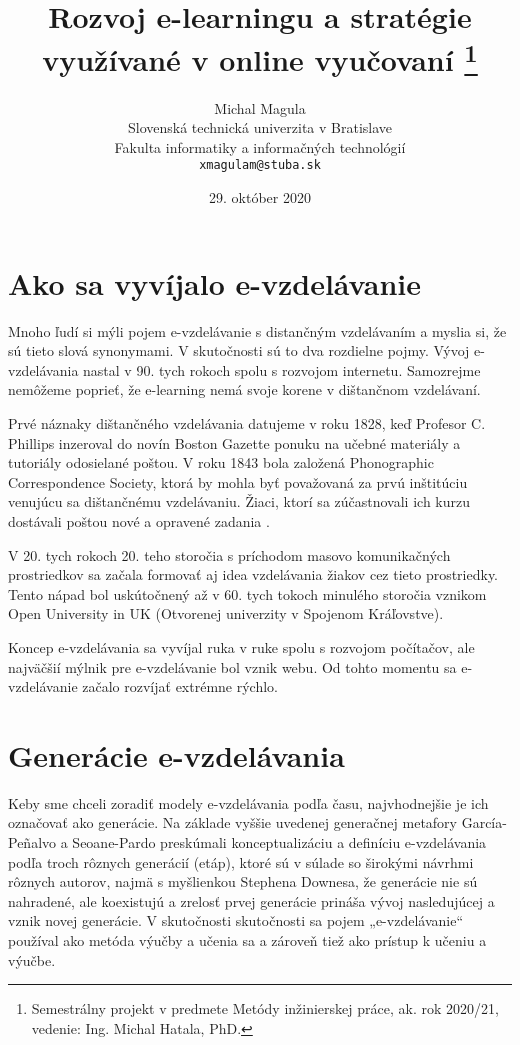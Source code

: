 \documentclass[10pt,slovak,a4paper]{article}
\title
{
	Rozvoj e-learningu a stratégie využívané v online vyučovaní
	\thanks
	{
		Semestrálny projekt v predmete Metódy inžinierskej práce, ak. rok 2020/21, vedenie: Ing. Michal Hatala, PhD.
	}
} %
\author{Michal Magula\\[2pt]
	{\small Slovenská technická univerzita v Bratislave}\\
	{\small Fakulta informatiky a informačných technológií}\\
	{\small \texttt{xmagulam@stuba.sk}}
	}
\date{\small 29. október 2020}
\begin{document}
\maketitle

\begin{abstract}
	
\end{abstract}

\section{Ako sa vyvíjalo e-vzdelávanie} \label{Evolution}

	Mnoho ľudí si mýli pojem e-vzdelávanie s distančným vzdelávaním a myslia si, že sú tieto slová synonymami.
	V skutočnosti sú to dva rozdielne pojmy. Vývoj e-vzdelávania nastal v 90. tych rokoch spolu s rozvojom internetu.
	Samozrejme nemôžeme poprieť, že e-learning nemá svoje korene v dištančnom vzdelávaní.\cite{main}

	Prvé náznaky dištančného vzdelávania datujeme v roku 1828, keď Profesor C. Phillips inzeroval do novín
	Boston Gazette ponuku na učebné materiály a tutoriály odosielané poštou. V roku 1843 bola 
	založená Phonographic Correspondence Society, ktorá by mohla byť považovaná za prvú inštitúciu 
	venujúcu sa dištančnému vzdelávaniu. Žiaci, ktorí sa zúčastnovali ich kurzu dostávali poštou
	nové a opravené zadania \cite{main}.

	V 20. tych rokoch 20. teho storočia s príchodom masovo komunikačných prostriedkov sa začala formovať aj idea
	vzdelávania žiakov cez tieto prostriedky. Tento nápad bol uskútočnený až v 60. tych tokoch minulého storočia 
	vznikom Open University in UK (Otvorenej univerzity v Spojenom Kráľovstve).\cite{main}

	Koncep e-vzdelávania sa vyvíjal ruka v ruke spolu s rozvojom počítačov, ale 
	najväčšií mýlnik pre e-vzdelávanie bol vznik webu. Od tohto momentu sa 
	e-vzdelávanie začalo rozvíjať extrémne rýchlo.\cite{main}



\section{Generácie e-vzdelávania} \label{Generations}

	Keby sme chceli zoradiť modely e-vzdelávania podľa času, najvhodnejšie je ich označovať ako generácie. Na základe vyššie uvedenej generačnej metafory García-Peñalvo a Seoane-Pardo preskúmali konceptualizáciu a definíciu e-vzdelávania podľa troch rôznych generácií (etáp), ktoré sú v súlade so širokými návrhmi rôznych autorov, najmä s myšlienkou Stephena Downesa, že generácie nie sú nahradené, ale koexistujú a zrelosť prvej generácie prináša vývoj nasledujúcej a vznik novej generácie. V skutočnosti skutočnosti sa pojem „e-vzdelávanie“ používal ako metóda výučby a učenia sa a zároveň tiež ako prístup k učeniu a výučbe.
	\cite{main}
\end{document}
